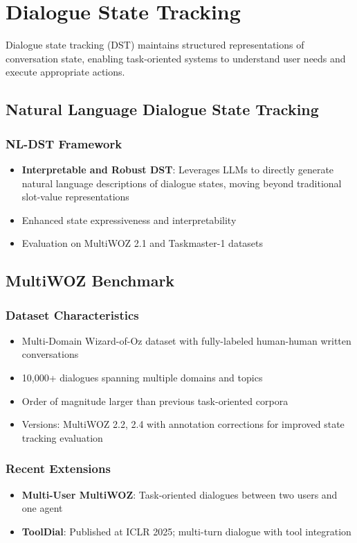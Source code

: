 \documentclass[11pt,letterpaper]{article}
\begin{document}
\section{Dialogue State Tracking}

Dialogue state tracking (DST) maintains structured representations of conversation state, enabling task-oriented systems to understand user needs and execute appropriate actions.

\subsection{Natural Language Dialogue State Tracking}

\subsubsection{NL-DST Framework}
\begin{itemize}[leftmargin=*]
    \item \textbf{Interpretable and Robust DST}: Leverages LLMs to directly generate natural language descriptions of dialogue states, moving beyond traditional slot-value representations
    \item Enhanced state expressiveness and interpretability
    \item Evaluation on MultiWOZ 2.1 and Taskmaster-1 datasets
\end{itemize}

\subsection{MultiWOZ Benchmark}

\subsubsection{Dataset Characteristics}
\begin{itemize}[leftmargin=*]
    \item Multi-Domain Wizard-of-Oz dataset with fully-labeled human-human written conversations
    \item 10,000+ dialogues spanning multiple domains and topics
    \item Order of magnitude larger than previous task-oriented corpora
    \item Versions: MultiWOZ 2.2, 2.4 with annotation corrections for improved state tracking evaluation
\end{itemize}

\subsubsection{Recent Extensions}
\begin{itemize}[leftmargin=*]
    \item \textbf{Multi-User MultiWOZ}: Task-oriented dialogues between two users and one agent
    \item \textbf{ToolDial}: Published at ICLR 2025; multi-turn dialogue with tool integration
\end{itemize}
\end{document}
